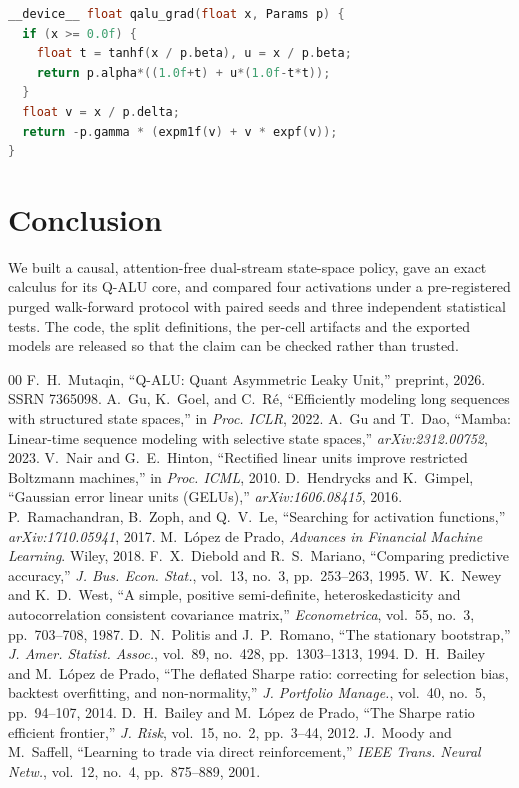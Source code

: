 \documentclass[conference]{IEEEtran}
\begin{document}
\begin{lstlisting}[caption={Q-ALU derivative in CUDA. The branch is on the sign
of $x$, not of $f$: a saturated exponential times a saturated $\tanh$ is
$0\cdot\infty$.},
                   label={lst:kernel}, language=C]
__device__ float qalu_grad(float x, Params p) {
  if (x >= 0.0f) {
    float t = tanhf(x / p.beta), u = x / p.beta;
    return p.alpha*((1.0f+t) + u*(1.0f-t*t));
  }
  float v = x / p.delta;
  return -p.gamma * (expm1f(v) + v * expf(v));
}
\end{lstlisting}

\section{Conclusion}

We built a causal, attention-free dual-stream state-space policy, gave an exact
calculus for its Q-ALU core, and compared four activations under a
pre-registered purged walk-forward protocol with paired seeds and three
independent statistical tests. \conclusionSentence{} The code, the split
definitions, the per-cell artifacts and the exported models are released so
that the claim can be checked rather than trusted.

\balance
\begin{thebibliography}{00}
 F.~H.~Mutaqin, ``Q-ALU: Quant Asymmetric Leaky Unit,''
preprint, 2026. SSRN 7365098.
 A.~Gu, K.~Goel, and C.~R\'e, ``Efficiently modeling long sequences
with structured state spaces,'' in \emph{Proc. ICLR}, 2022.
 A.~Gu and T.~Dao, ``Mamba: Linear-time sequence modeling with
selective state spaces,'' \emph{arXiv:2312.00752}, 2023.
 V.~Nair and G.~E.~Hinton, ``Rectified linear units improve
restricted Boltzmann machines,'' in \emph{Proc. ICML}, 2010.
 D.~Hendrycks and K.~Gimpel, ``Gaussian error linear units
(GELUs),'' \emph{arXiv:1606.08415}, 2016.
 P.~Ramachandran, B.~Zoph, and Q.~V.~Le, ``Searching for
activation functions,'' \emph{arXiv:1710.05941}, 2017.
 M.~L\'opez de Prado, \emph{Advances in Financial Machine
Learning}. Wiley, 2018.
 F.~X.~Diebold and R.~S.~Mariano, ``Comparing predictive accuracy,''
\emph{J. Bus. Econ. Stat.}, vol.~13, no.~3, pp.~253--263, 1995.
 W.~K.~Newey and K.~D.~West, ``A simple, positive semi-definite,
heteroskedasticity and autocorrelation consistent covariance matrix,''
\emph{Econometrica}, vol.~55, no.~3, pp.~703--708, 1987.
 D.~N.~Politis and J.~P.~Romano, ``The stationary bootstrap,''
\emph{J. Amer. Statist. Assoc.}, vol.~89, no.~428, pp.~1303--1313, 1994.
 D.~H.~Bailey and M.~L\'opez de Prado, ``The deflated Sharpe ratio:
correcting for selection bias, backtest overfitting, and non-normality,''
\emph{J. Portfolio Manage.}, vol.~40, no.~5, pp.~94--107, 2014.
 D.~H.~Bailey and M.~L\'opez de Prado, ``The Sharpe ratio efficient
frontier,'' \emph{J. Risk}, vol.~15, no.~2, pp.~3--44, 2012.
 J.~Moody and M.~Saffell, ``Learning to trade via direct
reinforcement,'' \emph{IEEE Trans. Neural Netw.}, vol.~12, no.~4, pp.~875--889,
2001.
\end{thebibliography}
\end{document}
